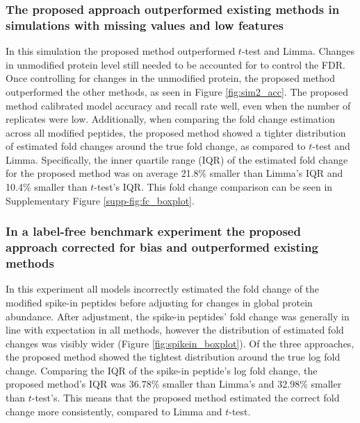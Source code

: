 \documentclass[mcp]{article}
\numberwithin{table}{section}
\begin{document}
\subsubsection*{The proposed approach outperformed existing methods in simulations with missing values and low features}

In this simulation the proposed method outperformed $t$-test and Limma. Changes in unmodified protein level still needed to be accounted for to control the FDR. Once controlling for changes in the unmodified protein, the proposed method outperformed the other methods, as seen in Figure \ref{fig:sim2_acc}. The proposed method calibrated model accuracy and recall rate well, even when the number of replicates were low. Additionally, when comparing the fold change estimation across all modified peptides, the proposed method showed a tighter distribution of estimated fold changes around the true fold change, as compared to $t$-test and Limma. Specifically, the inner quartile range (IQR) of the estimated fold change for the proposed method was on average 21.8\% smaller than Limma's IQR and 10.4\% smaller than $t$-test's IQR. This fold change comparison can be seen in Supplementary Figure \ref{supp-fig:fc_boxplot}.

\subsubsection*{In a label-free benchmark experiment the proposed approach corrected for bias and outperformed existing methods}

In this experiment all models incorrectly estimated the fold change of the modified spike-in peptides before adjusting for changes in global protein abundance. After adjustment, the spike-in peptides' fold change was generally in line with expectation in all methods, however the distribution of estimated fold changes was visibly wider (Figure \ref{fig:spikein_boxplot}). Of the three approaches, the proposed method showed the tightest distribution around the true log fold change. Comparing the IQR of the spike-in peptide's log fold change, the proposed method's IQR was 36.78\% smaller than Limma's and 32.98\% smaller than $t$-test's. This means that the proposed method estimated the correct fold change more consistently, compared to Limma and $t$-test.
\end{document}
